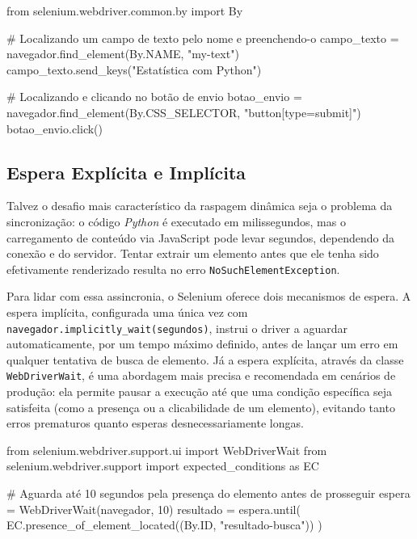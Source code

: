 \documentclass[
  brazilian,
  letterpaper,
  DIV=11,
  numbers=noendperiod]{scrreprt}
\newenvironment{Shaded}{\begin{snugshade}}{\end{snugshade}}
\newcommand{\CommentTok}[1]{\textcolor[rgb]{0.37,0.37,0.37}{#1}}
\newcommand{\DecValTok}[1]{\textcolor[rgb]{0.68,0.00,0.00}{#1}}
\newcommand{\ImportTok}[1]{\textcolor[rgb]{0.00,0.46,0.62}{#1}}
\newcommand{\NormalTok}[1]{\textcolor[rgb]{0.00,0.23,0.31}{#1}}
\newcommand{\OperatorTok}[1]{\textcolor[rgb]{0.37,0.37,0.37}{#1}}
\newcommand{\StringTok}[1]{\textcolor[rgb]{0.13,0.47,0.30}{#1}}
\begin{document}
\begin{Shaded}
\begin{Highlighting}[]
\ImportTok{from}\NormalTok{ selenium.webdriver.common.by }\ImportTok{import}\NormalTok{ By}

\CommentTok{\# Localizando um campo de texto pelo nome e preenchendo{-}o}
\NormalTok{campo\_texto }\OperatorTok{=}\NormalTok{ navegador.find\_element(By.NAME, }\StringTok{"my{-}text"}\NormalTok{)}
\NormalTok{campo\_texto.send\_keys(}\StringTok{"Estatística com Python"}\NormalTok{)}

\CommentTok{\# Localizando e clicando no botão de envio}
\NormalTok{botao\_envio }\OperatorTok{=}\NormalTok{ navegador.find\_element(By.CSS\_SELECTOR, }\StringTok{"button[type=\textquotesingle{}submit\textquotesingle{}]"}\NormalTok{)}
\NormalTok{botao\_envio.click()}
\end{Highlighting}
\end{Shaded}

\subsection{Espera Explícita e
Implícita}\label{espera-expluxedcita-e-impluxedcita}

Talvez o desafio mais característico da raspagem dinâmica seja o
problema da sincronização: o código \emph{Python} é executado em
milissegundos, mas o carregamento de conteúdo via JavaScript pode levar
segundos, dependendo da conexão e do servidor. Tentar extrair um
elemento antes que ele tenha sido efetivamente renderizado resulta no
erro \texttt{NoSuchElementException}.

Para lidar com essa assincronia, o Selenium oferece dois mecanismos de
espera. A espera implícita, configurada uma única vez com
\texttt{navegador.implicitly\_wait(segundos)}, instrui o driver a
aguardar automaticamente, por um tempo máximo definido, antes de lançar
um erro em qualquer tentativa de busca de elemento. Já a espera
explícita, através da classe \texttt{WebDriverWait}, é uma abordagem
mais precisa e recomendada em cenários de produção: ela permite pausar a
execução até que uma condição específica seja satisfeita (como a
presença ou a clicabilidade de um elemento), evitando tanto erros
prematuros quanto esperas desnecessariamente longas.

\begin{Shaded}
\begin{Highlighting}[]
\ImportTok{from}\NormalTok{ selenium.webdriver.support.ui }\ImportTok{import}\NormalTok{ WebDriverWait}
\ImportTok{from}\NormalTok{ selenium.webdriver.support }\ImportTok{import}\NormalTok{ expected\_conditions }\ImportTok{as}\NormalTok{ EC}

\CommentTok{\# Aguarda até 10 segundos pela presença do elemento antes de prosseguir}
\NormalTok{espera }\OperatorTok{=}\NormalTok{ WebDriverWait(navegador, }\DecValTok{10}\NormalTok{)}
\NormalTok{resultado }\OperatorTok{=}\NormalTok{ espera.until(}
\NormalTok{    EC.presence\_of\_element\_located((By.ID, }\StringTok{"resultado{-}busca"}\NormalTok{))}
\NormalTok{)}
\end{Highlighting}
\end{Shaded}
\end{document}
